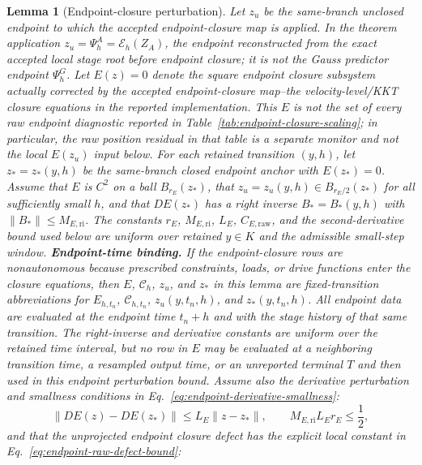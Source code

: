 \documentclass[preprint,12pt]{elsarticle}
\newtheorem{lemma}{Lemma}
\begin{document}
\begin{lemma}[Endpoint-closure perturbation]
\label{lem:endpoint-closure}
Let \(z_u\) be the same-branch unclosed endpoint to which the accepted
endpoint-closure map is applied. In the theorem application
\(z_u=\Psi_h^A=\mathcal E_h(Z_A)\), the endpoint reconstructed from the exact
accepted local stage root before endpoint closure; it is not the Gauss
predictor endpoint \(\Psi_h^G\). Let
$E(z)=0$ denote the square endpoint closure subsystem actually corrected by
the accepted endpoint-closure map--the velocity-level/KKT closure equations in
the reported implementation. This \(E\) is not the set of every raw endpoint
diagnostic reported in Table~\ref{tab:endpoint-closure-scaling}; in
particular, the raw position residual in that table is a separate monitor and
not the local \(E(z_u)\) input below. For each retained transition \((y,h)\),
let \(z_\ast=z_\ast(y,h)\) be the same-branch closed endpoint anchor with
\(E(z_\ast)=0\). Assume that $E$ is $C^2$ on a ball
$B_{r_E}(z_\ast)$, that
$z_u=z_u(y,h)\in B_{r_E/2}(z_\ast)$ for all sufficiently small $h$, and that
$D E(z_\ast)$ has a right inverse $B_\ast=B_\ast(y,h)$ with
$\|B_\ast\|\le M_{E,\mathrm{ri}}$. The constants
\(r_E\), \(M_{E,\mathrm{ri}}\), \(L_E\), \(C_{E,\mathrm{raw}}\), and the
second-derivative bound used below are uniform over retained \(y\in K\) and
the admissible small-step window.
\noindent\textbf{Endpoint-time binding.}
If the endpoint-closure rows are nonautonomous because prescribed constraints,
loads, or drive functions enter the closure equations, then \(E\),
\(\mathcal C_h\), \(z_u\), and \(z_\ast\) in this lemma are fixed-transition
abbreviations for \(E_{h,t_n}\), \(\mathcal C_{h,t_n}\),
\(z_u(y,t_n,h)\), and \(z_\ast(y,t_n,h)\).  All endpoint data are evaluated
at the endpoint time \(t_n+h\) and with the stage history of that same
transition.  The right-inverse and derivative constants are uniform over the
retained time interval, but no row in \(E\) may be evaluated at a neighboring
transition time, a resampled output time, or an unreported terminal \(T\) and
then used in this endpoint perturbation bound.
Assume also the derivative perturbation and smallness conditions in
Eq.~\eqref{eq:endpoint-derivative-smallness}:
\begin{equation}
\label{eq:endpoint-derivative-smallness}
  \|D E(z)-D E(z_\ast)\|\le L_E\|z-z_\ast\|,
  \qquad M_{E,\mathrm{ri}} L_E r_E\le \frac12 ,
\end{equation}
and that the unprojected endpoint closure defect has the explicit local
constant in Eq.~\eqref{eq:endpoint-raw-defect-bound}:

\end{lemma}
\end{document}
